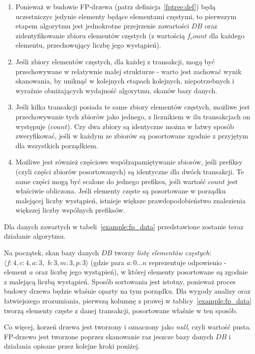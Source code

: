 \begin{enumerate}
	\item Ponieważ w budowie FP-drzewa (patrz definicja~\ref{fptree:def}) będą uczestniczyc jedynie elementy będące elementami częstymi, to pierwszym etapem algorytmu jest jednokrotne przejrzenie zawartości $DB$ oraz zidentyfikowanie zbioru elementów częstych (z wartością $f_count$ dla każdego elementu, przechowujący liczbę jego wystąpień).
	\item Jeśli zbiory elementów częstych, dla każdej z transakcji, mogą być przechowywane w relatywnie małej strukturze - warto jest zachować wynik skanowania, by uniknąć w kolejnych etapach kolejnych, niepotrzebnych i wyraźnie obniżających wydajność algorytmu, skanów bazy danych.
	\item Jeśli kilka transakcji posiada te same zbiory elementów częstych, możliwe jest przechowywanie tych zbiorów jako jednego, z licznikiem w ilu transakcjach on występuje ($count$). Czy dwa zbiory są identyczne można w łatwy sposób zweryfikować, jeśli w każdym ze zbiorów są posortowane zgodnie z przyjętym dla wszystkich porządkiem.
	\item Możliwe jest również częściowe współzapamiętywanie zbiorów, jeśli prefiksy (czyli części zbiorów posortowanych) są identyczne dla dwóch transakcji. Te same części mogą być scalone do jednego prefiksu, jeśli wartość $count$ jest właściwie obliczona. Jeśli elementy częste są posortowane w porządku malejącej liczby wystąpień, istnieje większe prawdopodobieństwo znalezienia większej liczby wspólnych prefiksów.
\end{enumerate}

Dla danych zawartych w tabeli~\ref{example:fp_data} przedstawione zostanie teraz działanie algorytmu.

Na początek, skan bazy danych $DB$ tworzy \emph{listę elementów częstych}: $\langle f: 4, c: 4, a: 3,$ $ b: 3, m: 3, p: 3\rangle$ (gdzie para $a:0\dots n$ reprezentuje odpowienio - element $a$ oraz liczbę jego wystąpień), w której elementy posortowane są zgodnie z malejącą liczbą wystąpień. Sposób sortowania jest istotny, ponieważ proces budowy drzewa będzie właśnie oparty na tym porządku. Dla wygody analizy oraz łatwiejszego zrozumiania, pierwszą kolumnę z prawej w tablicy~\ref{example:fp_data} tworzą elementy częste z danej transakcji, posortowane właśnie w ten sposób.

Co więcej, korzeń drzewa jest tworzony i oznaczony jako \emph{null}, czyli wartość pusta. FP-drzewo jest tworzone poprzez skanowanie raz jeszcze bazy danych $DB$ i działania opisane przez kolejne kroki poniżej.

